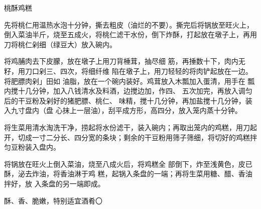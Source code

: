 \begin{recipe}{桃酥鸡糕}

\ingredients


\cooking

\step 先将桃仁用温热水泡十分钟，撕去粗皮（油烂的不要）。撕完后将锅放至旺火上，倒入菜油半斤，烧至五成火，将桃仁滤干水份，倒下炸酥，打起放在墩子上，再用刀将桃仁剁细（绿豆大）放入碗内。

将鸡脯肉去下皮朦，放在墩子上用刀背棰茸，抽尽细 筋，再捶数十下，肉内无籽，用刀口剁三、四次，将细纤维 陷在墩子上，用刀轻轻的将肉铲起放在一边。将肥膘肉剁」田如 油脂，放在一个碗内装好。鸡茸放入木瓢加入蛋清，用手在 瓢内搅十几分钟，加入八钱清水及料酒，边搅边加，作四、 五次加完，再放入调匀后的干豆粉及剁好的猪肥膘、桃仁、 味精，搅十几分钟，再加盐搅十几分钟，装入九寸盘内（盘 心抹上一层油），刮平成方形，高四分，放入笼内蒸十分钟。

\step 将生菜用清水淘洗干净，捞起将水份滤干，装入碗内；再取出笼内的鸡糕，用刀起开，切成一寸二分长、四分宽的条块；剩余的干豆粉用筛子筛细，将切好的鸡糕拌匀豆粉装入盘内。

将锅放在旺火上倒入菜油，烧至八成火后，将鸡糕全 部倒下，炸至浅黄色，皮已酥，泌去炸油，将香油淋于鸡 糕，起锅入条盘的一端；再将生菜用糖、醋、香油拌好，放 入条盘的另一端即成。

\notes

酥、香、脆嫩，特别适宜酒肴〇

\end{recipe}

